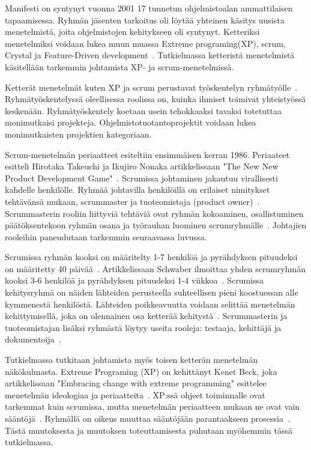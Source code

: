 \documentclass[finnish]{tktltiki2}
\theoremstyle{definition}
\theoremstyle{remark}
\begin{document}
Manifesti on syntynyt vuonna 2001 17 tunnetun ohjelmistoalan ammattilaisen tapaamisessa. Ryhmän jäsenten tarkoitus oli löytää yhteinen käsitys uusista menetelmistä, joita ohjelmistojen kehitykseen oli syntynyt. Ketteriksi menetelmiksi voidaan lukea muun muassa Extreme programing(XP), scrum, Crystal ja Feature-Driven development~\cite{fowler2001agile}. Tutkielmassa ketteristä menetelmistä käsitellään tarkemmin johtamista XP- ja scrum-menetelmissä.

Ketterät menetelmät kuten XP ja scrum perustavat työskentelyn ryh\-mä\-työl\-le~\cite{4755768}. Ryhmätyöskentelyssä oleellisessa roolissa on, kuinka ihmiset toimivat yhteistyössä keskenään. Ryhmätyöskentely koetaan usein tehokkaaksi tavaksi totetuttaa monimutkaisi projekteja. Ohjelmistotuotantoprojektit voidaan lukea monimutkaisten projektien kategoriaan. 

Scrum-menetelmän periaatteet esiteltiin ensimmäisen kerran 1986. Periaateet esitteli Hirotaka Takeuchi ja Ikujiro Nonaka artikkelissaan "The New New Product Development Game"~\cite{nonaka1986new}. Scrumissa johtaminen jakautuu virallisesti kahdelle henkilölle. Ryhmää johtavilla henkilöillä on erilaiset nimitykset tehtävänsä mukaan, scrummaster ja tuoteomistaja (product owner)~\cite{4755768}. Scrummasterin rooliin liittyviä tehtäviä ovat ryhmän kokoaminen, osallistuminen päätöksentekoon ryhmän osana ja työrauhan luominen scrumryhmälle~\cite{4755768}. Johtajien rooleihin paneudutaan tarkemmin seuraavassa luvussa.

Scrumissa ryhmän kooksi on määritelty 1-7 henkilöä ja pyrähdyksen pituudeksi on määritetty 40 päivää~\cite{cohen2004introduction}. Artikkelissaan Schwaber ilmoittaa yhden scrumryhmän kooksi 3-6 henkilöä ja pyrähdyksen pituudeksi 1-4 viikkoa~\cite{schwaber1995scrum}. Scrumissa kehitysryhmä on näiden lähteiden perusteella suhteellisen pieni koostuessan alle kymmenestä henkilöstä. Lähteiden poikkeavuutta voidaan selittää menetelmän kehittymisellä, joka on olennainen osa ketterää kehitystä~\cite{fowler2001agile}. Scrummasterin ja tuoteomistajan lisäksi ryhmästä löytyy useita rooleja: testaaja, kehittäjä ja dokumentoija~\cite{schwaber1995scrum}.

Tutkielmassa tutkitaan johtamista myös toisen ketterän menetelmän näkökulmasta. Extreme Programing (XP) on kehittänyt Kenet Beck, joka artikkelissaan "Embracing change with extreme programming" esittelee menetelmän ideologiaa ja periaatteita~\cite{796139}. XP:ssä ohjeet toiminnalle ovat tarkemmat kuin scrumissa, mutta menetelmän periaatteen mukaan ne ovat vain sääntöjä~\cite{cohen2004introduction}. Ryhmällä on oikeus muuttaa sääntöjään parantaakseen prosessia~\cite{cohen2004introduction}. Tästä muutoksesta ja muutoksen toteuttamisesta puhutaan myöhemmin tässä tutkielmassa. 
\end{document}
